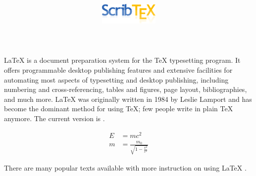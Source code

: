 \documentclass[12pt]{article}
\title{\includegraphics{logo}}
\date{}
\begin{document}
\maketitle 

\LaTeX{} is a document preparation system for the \TeX{} 
typesetting program. It offers programmable desktop publishing 
features and extensive facilities for automating most aspects of 
typesetting and desktop publishing, including numbering and 
cross-referencing, tables and figures, page layout, bibliographies, 
and much more. \LaTeX{} was originally written in 1984 by Leslie 
Lamport and has become the dominant method for using \TeX; few 
people write in plain \TeX{} anymore. The current version is 
\LaTeXe.
 
\begin{align}
  E &= mc^2                              \\
  m &= \frac{m_0}{\sqrt{1-\frac{v^2}{c^2}}}
\end{align}

There are many popular texts available with more instruction 
on using \LaTeX{} \cite{knuth, lamport}.



\end{document}
